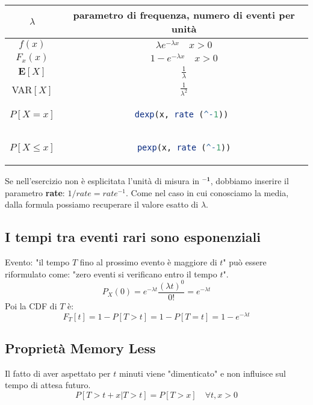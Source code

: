 \begingroup
\setlength{\tabcolsep}{10pt} %
\renewcommand{\arraystretch}{1.5} %
\begin{center}
\begin{tabular}{ |c|c| } 
\hline
\(\lambda\) & parametro di frequenza, numero di eventi per unità \\ \hline
\(f(x)\) & $\lambda e^{-\lambda x} \quad x > 0$ \\ \hline
\(F_x(x)\) & $1 - e^{-\lambda x} \quad x > 0$ \\ \hline
\(\mathbf{E}[X]\) & \(\frac{1}{\lambda}\) \\ \hline
VAR\([X]\) & \(\frac{1}{\lambda^2}\) \\ \hline\hline
\(P[X = x]\) & \begin{lstlisting}[language=R]
dexp(x, rate (^-1)) 
\end{lstlisting} \\ \hline
\(P[X \leq x]\) & \begin{lstlisting}[language=R]
pexp(x, rate (^-1))
\end{lstlisting} \\ \hline
\end{tabular}
\end{center}
\endgroup
\begin{tcolorbox}
Se nell'esercizio non è esplicitata l'unità di misura in \(\mathbf{^{-1}}\), dobbiamo inserire il parametro \textbf{rate}: \(1/rate = rate^{-1} \). Come nel caso in cui conosciamo la media, dalla formula possiamo recuperare il valore esatto di $\lambda$.
\end{tcolorbox}

\subsection{I tempi tra eventi rari sono esponenziali}
Evento: "il tempo \(T\) fino al prossimo evento è maggiore di \(t\)" può essere riformulato come: "zero eventi si verificano entro il tempo \(t\)".
\[P_X(0) = e^{-\lambda t}\frac{(\lambda t)^0}{0!} = e^{-\lambda t}\]
Poi la CDF di \(T\) è:
\[F_T[t] = 1 - P[T > t] = 1- P[T = t] = 1 - e^{-\lambda t}\]

\subsection{Proprietà Memory Less}
Il fatto di aver aspettato per \(t\) minuti viene "dimenticato" e non influisce sul tempo di attesa futuro.
\[P[T > t + x | T > t] = P[T > x] \quad \forall t,x > 0\]

